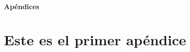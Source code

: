\documentclass[12pt,twoside,titlepage]{report}
\newcommand\blankpage{%
    \newpage
    \null
    \thispagestyle{empty}%
    \newpage}
\begin{document}

{}

\footnotesize{
	
	
}



\raggedbottom
\afterpage{\blankpage}

\newpage





\appendix

{}

\mbox{}
\vfill
\begin{center}
	\begin{Huge}
		\textbf{Apéndices}
	\end{Huge}
\end{center}
\vfill
\mbox{}
\thispagestyle{empty}

\newpage
\mbox{}
\thispagestyle{empty}
\newpage


\chapter{Este es el primer apéndice}
\label{sec:apendice}



\end{document}
